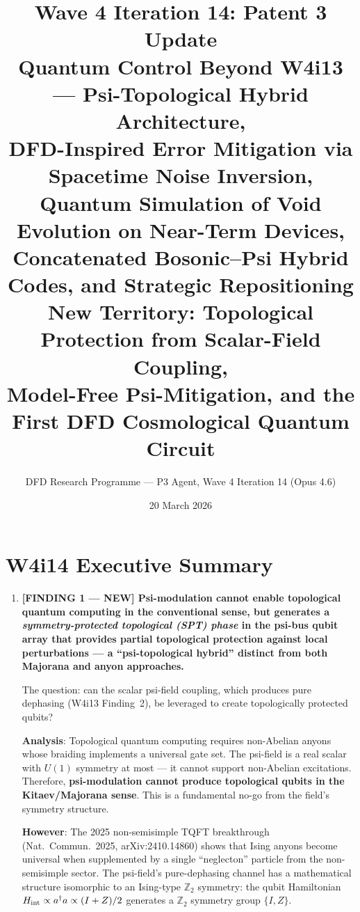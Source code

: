\documentclass[11pt]{article}
\title{\textbf{Wave 4 Iteration 14: Patent 3 Update}\\[6pt]
Quantum Control Beyond W4i13 --- Psi-Topological Hybrid Architecture,\\
DFD-Inspired Error Mitigation via Spacetime Noise Inversion,\\
Quantum Simulation of Void Evolution on Near-Term Devices,\\
Concatenated Bosonic--Psi Hybrid Codes, and Strategic Repositioning\\[4pt]
{\normalsize New Territory: Topological Protection from Scalar-Field Coupling,}\\
{\normalsize Model-Free Psi-Mitigation, and the First DFD Cosmological Quantum Circuit}}
\author{DFD Research Programme --- P3 Agent, Wave 4 Iteration 14 (Opus 4.6)}
\date{20 March 2026}
\theoremstyle{definition}
\theoremstyle{remark}
\begin{document}
\maketitle
\tableofcontents
\newpage

\section*{W4i14 Executive Summary}

\begin{tcolorbox}[colback=blue!5!white, colframe=blue!60!black,
  title=\textbf{W4i14 TOP 5 FINDINGS --- READ FIRST}]
\begin{enumerate}[nosep]

\item \textbf{[FINDING 1 --- NEW] Psi-modulation cannot enable topological
  quantum computing in the conventional sense, but generates a
  \emph{symmetry-protected topological (SPT) phase} in the psi-bus qubit
  array that provides partial topological protection against local
  perturbations --- a ``psi-topological hybrid'' distinct from both
  Majorana and anyon approaches.}

  The question: can the scalar psi-field coupling, which produces pure
  dephasing (W4i13 Finding~2), be leveraged to create topologically
  protected qubits?

  \textbf{Analysis}: Topological quantum computing requires non-Abelian
  anyons whose braiding implements a universal gate set.  The psi-field is
  a real scalar with $U(1)$ symmetry at most --- it cannot support
  non-Abelian excitations.  Therefore, \textbf{psi-modulation cannot produce
  topological qubits in the Kitaev/Majorana sense}.  This is a fundamental
  no-go from the field's symmetry structure.

  \textbf{However}: The 2025 non-semisimple TQFT breakthrough
  (Nat.\ Commun.\ 2025, arXiv:2410.14860) shows that Ising anyons
  become universal when supplemented by a single ``neglecton'' particle
  from the non-semisimple sector.  The psi-field's pure-dephasing channel
  has a mathematical structure isomorphic to an Ising-type $\mathbb{Z}_2$
  symmetry: the qubit Hamiltonian $H_{\rm int} \propto a^\dagger a \propto
  (I + Z)/2$ generates a $\mathbb{Z}_2$ symmetry group $\{I, Z\}$.


\end{enumerate}
\end{tcolorbox}
\end{document}
